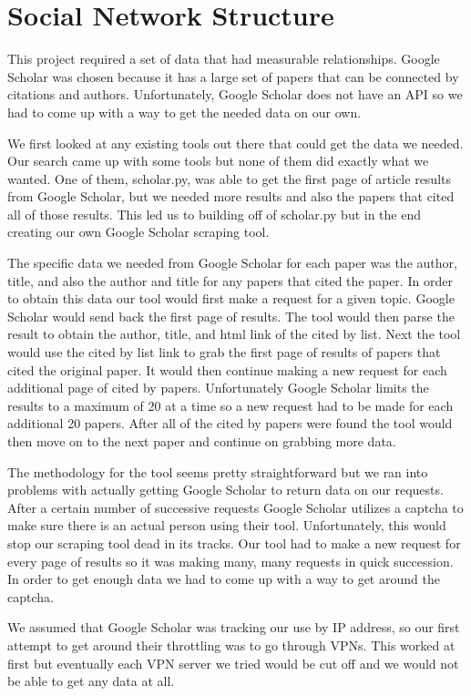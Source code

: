 \documentclass[letterpaper]{article}
\begin{document}
\section{Social Network Structure}

This project required a set of data that had measurable relationships.
Google Scholar was chosen because it has a large set of papers that can be connected by citations and authors.
Unfortunately, Google Scholar does not have an API so we had to come up with a way to get the needed data on our own.

We first looked at any existing tools out there that could get the data we needed.
Our search came up with some tools but none of them did exactly what we wanted.
One of them, scholar.py, was able to get the first page of article results from Google Scholar, but we needed more results and also the papers that cited all of those results.
This led us to building off of scholar.py but in the end creating our own Google Scholar scraping tool.

The specific data we needed from Google Scholar for each paper was the author, title, and also the author and title for any papers that cited the paper.
In order to obtain this data our tool would first make a request for a given topic.
Google Scholar would send back the first page of results.
The tool would then parse the result to obtain the author, title, and html link of the cited by list.
Next the tool would use the cited by list link to grab the first page of results of papers that cited the original paper.
It would then continue making a new request for each additional page of cited by papers. Unfortunately Google Scholar limits the results to a maximum of 20 at a time so a new request had to be made for each additional 20 papers.
After all of the cited by papers were found the tool would then move on to the next paper and continue on grabbing more data.

The methodology for the tool seems pretty straightforward but we ran into problems with actually getting Google Scholar to return data on our requests.
After a certain number of successive requests Google Scholar utilizes a captcha to make sure there is an actual person using their tool.
Unfortunately, this would stop our scraping tool dead in its tracks.
Our tool had to make a new request for every page of results so it was making many, many requests in quick succession.
In order to get enough data we had to come up with a way to get around the captcha.

We assumed that Google Scholar was tracking our use by IP address, so our first attempt to get around their throttling was to go through VPNs.
This worked at first but eventually each VPN server we tried would be cut off and we would not be able to get any data at all.
\end{document}
